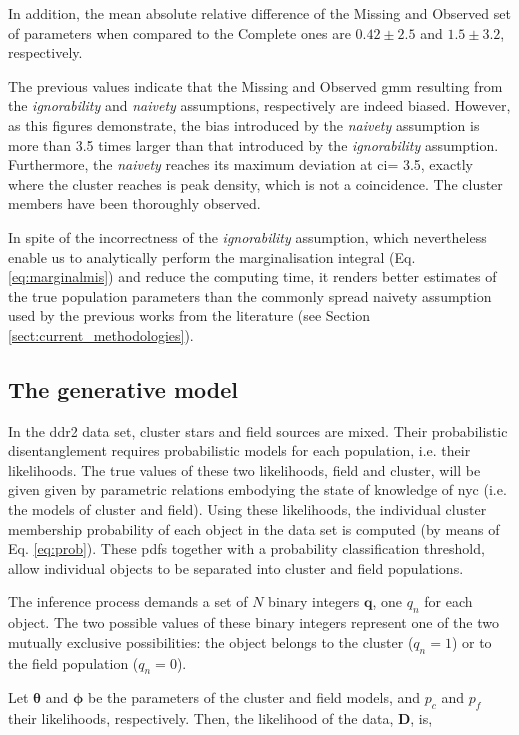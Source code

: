 In addition, the mean absolute relative difference of the Missing and Observed set of parameters when compared to the Complete ones are $0.42 \pm 2.5$ and $1.5 \pm 3.2$, respectively.  

The previous values indicate that the Missing and Observed \gls{gmm} resulting from the \emph{ignorability} and \emph{naivety} assumptions, respectively are indeed biased. However, as this figures demonstrate, the bias introduced by the \emph{naivety} assumption is more than 3.5 times larger than that introduced by the \emph{ignorability} assumption. Furthermore, the \emph{naivety} reaches its maximum deviation at \gls{ci}= 3.5, exactly where the cluster reaches is peak density, which is not a coincidence. The cluster members have been thoroughly observed.

In spite of the incorrectness of the \emph{ignorability} assumption, which nevertheless enable us to analytically perform the marginalisation integral (Eq. \ref{eq:marginalmis}) and reduce the computing time, it renders better estimates of the true population parameters than the commonly spread naivety assumption used by the previous works from the literature (see Section \ref{sect:current_methodologies}). 

\subsection{The generative model}
\label{sect:generative-model}
In the \gls{ddr2} data set, cluster stars and field sources are mixed. Their probabilistic disentanglement requires probabilistic models for each population, i.e. their likelihoods. The true values of these two likelihoods, field and cluster, will be given given by parametric relations embodying the state of knowledge of \gls{nyc} (i.e. the models of cluster and field).  Using these likelihoods, the individual cluster membership probability of each object in the data set is computed (by means of Eq. \ref{eq:prob}). These \glspl{pdf}  together with a probability classification threshold, allow individual objects to be separated into cluster and field populations.

The inference process demands a set of $N$ binary integers $\mathbf{q}$, one $q_n$ for each object. The two possible values of these binary integers represent one of the two mutually exclusive possibilities: the object belongs to the cluster ($q_n=1$) or to the field population ($q_n=0$). 

Let $\boldsymbol{\theta}$ and $\boldsymbol{\phi}$ be the parameters of the cluster and field models, and $p_c$ and $p_f$ their likelihoods, respectively. Then, the likelihood of the data, $\mathbf{D}$, is,

